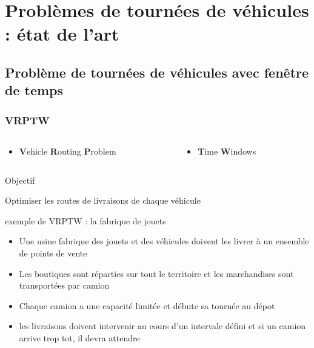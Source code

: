 \documentclass{beamer}
\begin{document}
\section{Problèmes de tournées de véhicules : état de l'art}

\subsection*{Problème de tournées de véhicules avec fenêtre de temps}

\begin{frame}
\frametitle{VRPTW\cite{Berbeglia07}}
	\begin{columns}
	 	\begin{column}[l]{6cm} \begin{center}
			\begin{itemize}
 				\item \small{\textbf{V}ehicle \textbf{R}outing \textbf{P}roblem}
			\end{itemize} \end{center}
	 	\end{column}
	 	\begin{column}[r]{6cm} \begin{center}
			\begin{itemize} 
				\item \small{\textbf{T}ime \textbf{W}indows}
			\end{itemize} \end{center}
	 	\end{column}
	\end{columns}
	\begin{block}{Objectif}
		\begin{center} Optimiser les routes de livraisons de chaque véhicule\end{center}
	\end{block}
		
	\begin{exampleblock}{exemple de VRPTW : la fabrique de jouets}
		\small{\begin{itemize}
			\item Une usine fabrique des jouets et des véhicules doivent les livrer à un ensemble de points de vente
			\item Les boutiques sont réparties sur tout le territoire et les marchandises sont transportées par camion
			\item Chaque camion a une capacité limitée et débute sa tournée au dépot
			\item les livraisons doivent intervenir au cours d'un intervale défini et si un camion arrive trop tot, il devra attendre
		\end{itemize}}
	\end{exampleblock}
\end{frame}
\end{document}
